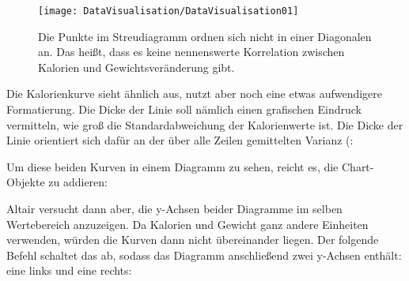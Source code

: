 \begin{figure}
	\texttt{[image: DataVisualisation/DataVisualisation01]}
	\caption[Kalorien und Gewichtsveränderung]{Die Punkte im Streudiagramm ordnen sich nicht in einer Diagonalen an. Das heißt, dass es keine nennenswerte Korrelation zwischen Kalorien und Gewichtsveränderung gibt.}
\end{figure}



Die Kalorienkurve sieht ähnlich aus, nutzt aber noch eine etwas aufwendigere Formatierung. Die Dicke der Linie soll nämlich einen grafischen Eindruck vermitteln, wie groß die Standardabweichung der Kalorienwerte ist. Die Dicke der Linie orientiert sich dafür an der über alle Zeilen gemittelten Varianz (:

\medskip













\PYTHON{)}

\medskip

Um diese beiden Kurven in einem Diagramm zu sehen, reicht es, die Chart-Objekte zu addieren:


\medskip


\medskip

Altair versucht dann aber, die y-Achsen beider Diagramme im selben Wertebereich anzuzeigen. Da Kalorien und Gewicht ganz andere Einheiten verwenden, würden die Kurven dann nicht übereinander liegen. Der folgende Befehl schaltet das ab, sodass das Diagramm anschließend zwei y-Achsen enthält: eine links und eine rechts:


